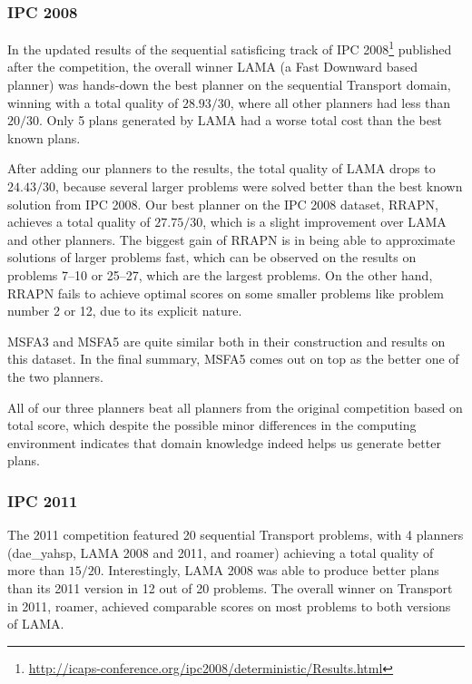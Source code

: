\subsubsection{IPC 2008}

In the updated results of the sequential satisficing track of IPC 2008\footnote{\url{http://icaps-conference.org/ipc2008/deterministic/Results.html}} published after the competition,
the overall winner LAMA (a Fast Downward based planner)
was hands-down the best planner on the sequential Transport domain, winning
with a total quality of $28.93/30$, where all other planners had less than $20/30$.
Only 5 plans generated by LAMA had a worse total cost than the best known plans.

After adding our planners to the results,
the total quality of LAMA drops to $24.43/30$,
because several larger problems were solved better than the
best known solution from IPC 2008.
Our best planner on the IPC 2008 dataset, RRAPN, achieves a total quality of $27.75/30$,
which is a slight improvement over LAMA and other planners. The biggest gain of RRAPN is in being able to approximate
solutions of larger problems fast, which can be observed on
the results on problems 7--10 or 25--27,
which are the largest problems.
On the other hand, RRAPN fails to achieve optimal scores
on some smaller problems like problem number 2 or 12,
due to its explicit nature.

MSFA3 and MSFA5 are quite similar both in their construction and results on this dataset.
In the final summary, MSFA5 comes out on top as the better one of the two planners.

All of our three planners beat all planners from the original competition based on total score,
which despite the possible minor differences in the computing environment indicates that
domain knowledge indeed helps us generate better plans.

\subsubsection{IPC 2011}

The 2011 competition featured 20 sequential Transport problems,
with 4 planners (dae\_yahsp, LAMA 2008 and 2011, and roamer) achieving a total quality of more than $15/20$.
Interestingly, LAMA 2008 was able to produce better plans than its 2011 version in 12 out of 20 problems. The overall winner on Transport in 2011, roamer, achieved comparable scores on most problems to both versions of LAMA.

